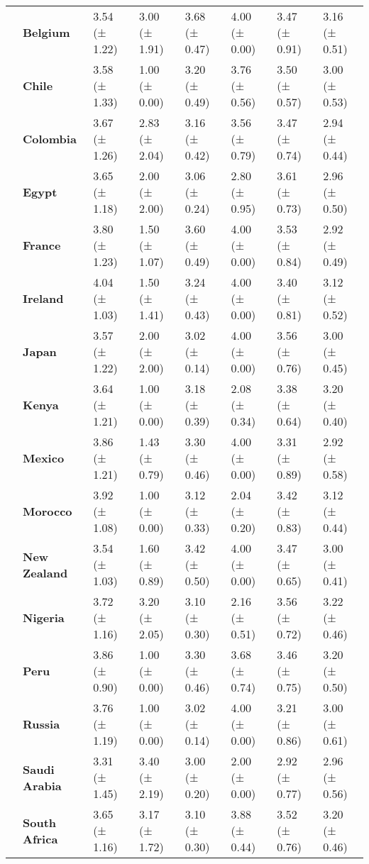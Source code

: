 \begin{longtable}{llllllll}
\textbf{} & \textbf{Belgium} & 3.54 (± 1.22) & 3.00 (± 1.91) & 3.68 (± 0.47) & 4.00 (± 0.00) & 3.47 (± 0.91) & 3.16 (± 0.51) \\
\textbf{} & \textbf{Chile} & 3.58 (± 1.33) & 1.00 (± 0.00) & 3.20 (± 0.49) & 3.76 (± 0.56) & 3.50 (± 0.57) & 3.00 (± 0.53) \\
\textbf{} & \textbf{Colombia} & 3.67 (± 1.26) & 2.83 (± 2.04) & 3.16 (± 0.42) & 3.56 (± 0.79) & 3.47 (± 0.74) & 2.94 (± 0.44) \\
\textbf{} & \textbf{Egypt} & 3.65 (± 1.18) & 2.00 (± 2.00) & 3.06 (± 0.24) & 2.80 (± 0.95) & 3.61 (± 0.73) & 2.96 (± 0.50) \\
\textbf{} & \textbf{France} & 3.80 (± 1.23) & 1.50 (± 1.07) & 3.60 (± 0.49) & 4.00 (± 0.00) & 3.53 (± 0.84) & 2.92 (± 0.49) \\
\textbf{} & \textbf{Ireland} & 4.04 (± 1.03) & 1.50 (± 1.41) & 3.24 (± 0.43) & 4.00 (± 0.00) & 3.40 (± 0.81) & 3.12 (± 0.52) \\
\textbf{} & \textbf{Japan} & 3.57 (± 1.22) & 2.00 (± 2.00) & 3.02 (± 0.14) & 4.00 (± 0.00) & 3.56 (± 0.76) & 3.00 (± 0.45) \\
\textbf{} & \textbf{Kenya} & 3.64 (± 1.21) & 1.00 (± 0.00) & 3.18 (± 0.39) & 2.08 (± 0.34) & 3.38 (± 0.64) & 3.20 (± 0.40) \\
\textbf{} & \textbf{Mexico} & 3.86 (± 1.21) & 1.43 (± 0.79) & 3.30 (± 0.46) & 4.00 (± 0.00) & 3.31 (± 0.89) & 2.92 (± 0.58) \\
\textbf{} & \textbf{Morocco} & 3.92 (± 1.08) & 1.00 (± 0.00) & 3.12 (± 0.33) & 2.04 (± 0.20) & 3.42 (± 0.83) & 3.12 (± 0.44) \\
\textbf{} & \textbf{New Zealand} & 3.54 (± 1.03) & 1.60 (± 0.89) & 3.42 (± 0.50) & 4.00 (± 0.00) & 3.47 (± 0.65) & 3.00 (± 0.41) \\
\textbf{} & \textbf{Nigeria} & 3.72 (± 1.16) & 3.20 (± 2.05) & 3.10 (± 0.30) & 2.16 (± 0.51) & 3.56 (± 0.72) & 3.22 (± 0.46) \\
\textbf{} & \textbf{Peru} & 3.86 (± 0.90) & 1.00 (± 0.00) & 3.30 (± 0.46) & 3.68 (± 0.74) & 3.46 (± 0.75) & 3.20 (± 0.50) \\
\textbf{} & \textbf{Russia} & 3.76 (± 1.19) & 1.00 (± 0.00) & 3.02 (± 0.14) & 4.00 (± 0.00) & 3.21 (± 0.86) & 3.00 (± 0.61) \\
\textbf{} & \textbf{Saudi Arabia} & 3.31 (± 1.45) & 3.40 (± 2.19) & 3.00 (± 0.20) & 2.00 (± 0.00) & 2.92 (± 0.77) & 2.96 (± 0.56) \\
\textbf{} & \textbf{South Africa} & 3.65 (± 1.16) & 3.17 (± 1.72) & 3.10 (± 0.30) & 3.88 (± 0.44) & 3.52 (± 0.76) & 3.20 (± 0.46) \\

\end{longtable}
